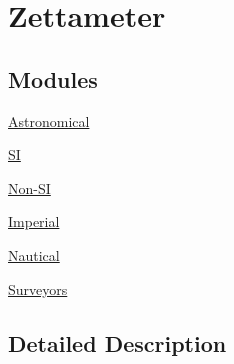 \hypertarget{group___e_g_x_math-_conversions-_length_conversions-_zettameter}{}\section{Zettameter}
\label{group___e_g_x_math-_conversions-_length_conversions-_zettameter}
\subsection*{Modules}
\begin{DoxyCompactItemize}
\item 
\mbox{\hyperlink{group___e_g_x_math-_conversions-_length_conversions-_zettameter-_astronomical}{Astronomical}}
\item 
\mbox{\hyperlink{group___e_g_x_math-_conversions-_length_conversions-_zettameter-_s_i}{SI}}
\item 
\mbox{\hyperlink{group___e_g_x_math-_conversions-_length_conversions-_zettameter-_non-_s_i}{Non-\/\+SI}}
\item 
\mbox{\hyperlink{group___e_g_x_math-_conversions-_length_conversions-_zettameter-_imperial}{Imperial}}
\item 
\mbox{\hyperlink{group___e_g_x_math-_conversions-_length_conversions-_zettameter-_nautical}{Nautical}}
\item 
\mbox{\hyperlink{group___e_g_x_math-_conversions-_length_conversions-_zettameter-_surveyors}{Surveyors}}
\end{DoxyCompactItemize}


\subsection{Detailed Description}

